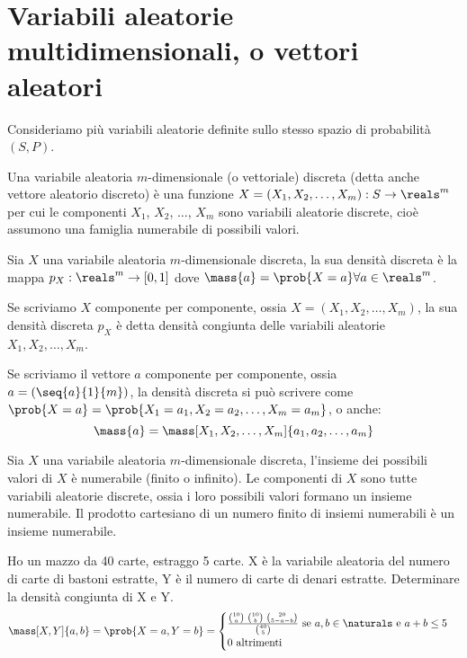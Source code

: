 \section{Variabili aleatorie multidimensionali, o vettori aleatori}

Consideriamo pi\`u variabili aleatorie definite sullo stesso spazio di probabilit\`a $(S,P)$.

\begin{defn}
Una variabile aleatoria $m$-dimensionale (o vettoriale) discreta (detta anche vettore aleatorio discreto) \`e una funzione $X = (X_1, X_2, \ldots, X_m) : S \to \reals^m$ per cui le componenti $X_1$, $X_2$, $\ldots$, $X_m$ sono variabili aleatorie discrete, cio\`e assumono una famiglia numerabile di possibili valori.
\end{defn}

\begin{defn}
Sia $X$ una variabile aleatoria $m$-dimensionale discreta, la sua densit\`a discreta \`e la mappa $p_X : \reals^m \to [0,1]$ dove $\mass{a} = \prob{X = a} \forall a \in \reals^m$.
\end{defn}
Se scriviamo $X$ componente per componente, ossia $X = (X_1, X_2, \ldots, X_m)$, la sua densit\`a discreta $p_X$ \`e detta densit\`a congiunta delle variabili aleatorie $X_1, X_2, \ldots, X_m$.

Se scriviamo il vettore $a$ componente per componente, ossia $a = (\seq{a}{1}{m})$, la densit\`a discreta si pu\`o scrivere come $\prob{X = a} = \prob{X_1 = a_1, X_2 = a_2, \ldots, X_m = a_m}$, o anche:
\[
\mass{a} = \mass[X_1, X_2, \ldots, X_m]{a_1, a_2, \ldots, a_m}
\]

\begin{oss}
Sia $X$ una variabile aleatoria $m$-dimensionale discreta, l'insieme dei possibili valori di $X$ \`e numerabile (finito o infinito). Le componenti di $X$ sono tutte variabili aleatorie discrete, ossia i loro possibili valori formano un insieme numerabile. Il prodotto cartesiano di un numero finito di insiemi numerabili \`e un insieme numerabile.
\end{oss}

\begin{exmp}
Ho un mazzo da 40 carte, estraggo 5 carte. X \`e la variabile aleatoria del numero di carte di bastoni estratte, Y \`e il numero di carte di denari estratte. Determinare la densit\`a congiunta di X e Y.
\[
\mass[X,Y]{a,b} = \prob{X = a, Y = b} =
\begin{cases}
\frac{\binom{10}{a} \ \binom{10}{b} \ \binom{20}{5 - a - b}}{\binom{40}{5}}
\text{ se } a,b \in \naturals \text{ e } a + b \le 5 \\
0 \text{ altrimenti}
\end{cases}
\]
\end{exmp}

